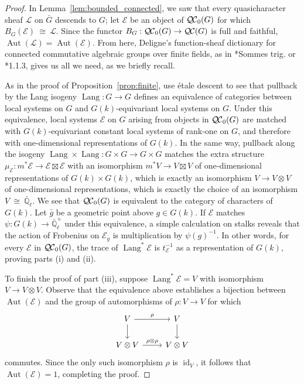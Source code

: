 \documentclass[CM,Submssn,SecEq]{degruyter-crelle} %
\theoremstyle{plain}
\theoremstyle{definition}
\theoremstyle{remark}
\newcommand{\EE}{\mathbb{\bar Q}_\ell}
\newcommand{\Fq}{k}
\newcommand{\EEx}{\EE^\times}
\DeclareMathOperator{\Aut}{Aut}
\DeclareMathOperator{\id}{id}
\DeclareMathOperator{\Lang}{Lang}
\newcommand{\iso}{{\ \cong\ }}
\newcommand{\trFrob}[1]{t_{#1}}
\newcommand{\qcs}[1]{{\mathcal{#1}}}
\newcommand{\QC}{{\mathcal{Q\hskip-0.8pt C}}}
\newcommand{\bQC}{{\QC_0}}
\newcommand{\bg}{\bar{g}}
\newcommand{\bG}{\bar{G}}
\begin{document}
\begin{proof}
In Lemma~\ref{lem:bounded_connected}, we saw that every quasicharacter sheaf $\qcs{L}$ on $\bG$ descends to $G$; let $\qcs{E}$ be an object of $\bQC(G)$ for which $B_G(\qcs{E}) \iso \qcs{L}$.
 Since the functor $B_G : \bQC(G) \to \QC(G)$ is full and faithful, $\Aut(\qcs{L}) = \Aut(\qcs{E})$.
From here, Deligne's function-sheaf dictionary for connected commutative algebraic groups over finite fields, as in \cite{deligne:SGA4.5}*{Sommes trig.} or \cite{laumon:87a}*{1.1.3}, gives us all we need, as we briefly recall. %

As in the proof of Proposition~\ref{prop:finite}, use \'etale descent to see that pullback by the Lang isogeny $\Lang : G\to G$ defines an equivalence of categories between local systems on $G$ and $G(\Fq)$-equivariant local systems on $G$. 
Under this equivalence, local systems $\qcs{E}$ on $G$ arising from objects in $\bQC(G)$ are matched with $G(\Fq)$-equivariant constant local systems of rank-one on $G$, and therefore with one-dimensional representations of $G(\Fq)$. 
In the same way, pullback along the isogeny $\Lang\times\Lang : G\times G\to G\times G$ matches the extra structure $\mu_\qcs{E} : m^*\qcs{E} \to \qcs{E}\boxtimes\qcs{E}$ with an isomorphism $m^*V \to V\boxtimes V$ of one-dimensional representations of $G(\Fq)\times G(\Fq)$, which is exactly an isomorphism $V \to V\otimes V$ of one-dimensional representations, which is exactly the choice of an isomorphism $V\iso \EE$.
We see that $\bQC(G)$ is equivalent to the category of characters of $G(\Fq)$.
Let $\bg$ be a geometric point above $g \in G(\Fq)$.  If $\qcs{E}$ matches $\psi : G(\Fq)\to \EEx$ under this equivalence, a simple calculation on stalks reveals that the action of Frobenius on $\qcs{E}_{\bar g}$ is multiplication by $\psi(g)^{-1}$.
In other words, for every $\qcs{E}$ in $\bQC(G)$, the trace of $\Lang^*\qcs{E}$ is $\trFrob{\qcs{E}}^{-1}$ as a representation of $G(\Fq)$, proving parts (i) and (ii).

To finish the proof of part (iii), suppose $\Lang^*\qcs{E} = V$ with isomorphism $V \to V\otimes V$.  Observe that the equivalence above establishes a bijection between $\Aut(\qcs{E})$ and the group of automorphisms of $\rho : V\to V$ for which 
\[
\begin{tikzcd}
\arrow{d}{} V \arrow{r}{\rho} & V\arrow{d}{}\\
V\otimes V \arrow{r}{\rho\otimes \rho} & V\otimes V
\end{tikzcd}
\]
commutes. 
Since the only such isomorphism $\rho$ is $\id_V$, it follows that $\Aut(\qcs{E}) = 1$, completing the proof.
\end{proof}
\end{document}
